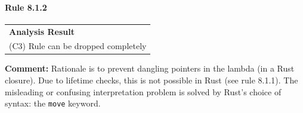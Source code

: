 \paragraph{Rule 8.1.2}
\begin{longtable}{p{13cm}}
\textbf{Analysis Result} \\
(C3) Rule can be dropped completely \\
\end{longtable}
\textbf{Comment:} Rationale is to prevent dangling pointers in the lambda (in a Rust closure). Due to lifetime checks, this is not possible in Rust (see rule 8.1.1). The misleading or confusing interpretation problem is solved by Rust's choice of syntax: the \texttt{move} keyword. \\
